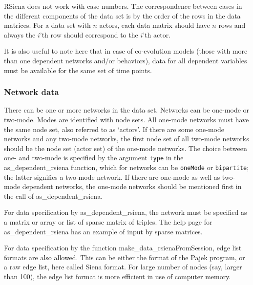 \documentclass[a4paper,fleqn,11pt]{article}
\newcommand{\+}{\, + \,}
\newcommand{\RS}{{\sf \textsf{RSiena} }}
\begin{document}
\RS does not work with case numbers. The correspondence between cases
in the different components of the data set is by the order of the rows
in the data matrices. For a data set with $n$ actors,
each data matrix should have $n$ rows and always the $i$'th row
should correspond to the $i$'th actor.

It is also useful to note here that in case of co-evolution models (those with
more than one dependent networks and/or behaviors), data for all dependent
variables must be available for the same set of time points.


\subsubsection{Network data}

There can be one or more networks in the data set.
Networks can be one-mode or two-mode.
Modes are identified with node sets.
All one-mode networks must have the same node set,
also referred to as `actors'.
If there are some one-mode networks and any two-mode networks,
the first node set of all two-mode networks should be the node set
(actor set) of the one-mode networks.
The choice between one- and two-mode is specified by the argument
\texttt{type} in  the \textsf{as\_dependent\_rsiena} function, which for
networks can be \texttt{oneMode} or \texttt{bipartite};
the latter signifies a two-mode network.
If there are one-mode as well as two-mode dependent networks,
the one-mode networks should be mentioned first in the call of
\textsf{as\_dependent\_rsiena}.


For data specification by  \textsf{as\_dependent\_rsiena}, the network
must be specified as a matrix or array or list of sparse matrix of triples.
The help page for \textsf{as\_dependent\_rsiena} has an example of input
by sparse matrices.

For data specification by
the function \textsf{make\_data\_rsienaFromSession},
edge list formats are also allowed. This can be either the
format of the Pajek program, or a raw edge list, here called Siena format.
For large number of nodes (say, larger than 100), the edge list
format is more efficient in use of computer memory.
\end{document}
